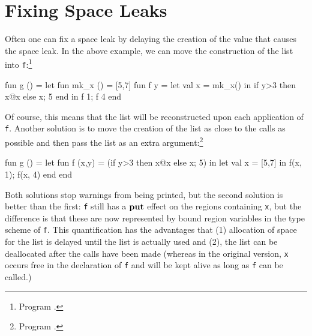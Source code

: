 \documentclass[12pt]{book}
\begin{document}
\section{Fixing Space Leaks}
Often one can fix a space leak by delaying the creation of the value that causes
the space leak. In the above example, we can move the construction of the list
into \lstinline{f}:\footnote{Program .}
\begin{smlcode}
fun g () =
    let fun mk_x () = [5,7]
        fun f y = let val x = mk_x()
                  in if y>3 then x@x else x; 5
                  end
    in f 1; f 4
    end
\end{smlcode}
Of course, this means that the list will be reconstructed upon each
application of \lstinline{f}. Another solution is to move the creation of
the list as close to the calls as possible and then pass the list as
an extra argument:\footnote{Program .}
\begin{smlcode}
fun g () =
    let fun f (x,y) = (if y>3 then x@x else x; 5)
    in let val x = [5,7]
       in f(x, 1); f(x, 4)
       end
    end
\end{smlcode}
Both solutions stop warnings from being printed, but the second solution is
better than the first: \lstinline{f} still has a $\mathop{\bf put}\nolimits$ effect on the regions
containing \lstinline{x}, but the difference is that these are now represented
by bound region variables in the type scheme of \lstinline{f}. This
quantification has the advantages that (1) allocation of space for the list is
delayed until the list is actually used and (2), the list can be deallocated
after the calls have been made (whereas in the original version, \lstinline{x}
occurs free in the declaration of \lstinline{f} and will be kept alive as long
as \lstinline{f} can be called.)
\end{document}
